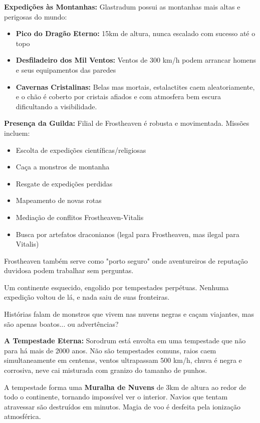 \textbf{\ringmfamily Expedições às Montanhas:}
Glastradum possui as montanhas mais altas e perigosas do mundo:
\begin{itemize}
    \item \textbf{Pico do Dragão Eterno:} 15km de altura, nunca escalado com sucesso até o topo
    \item \textbf{Desfiladeiro dos Mil Ventos:} Ventos de 300 km/h podem arrancar homens e seus equipamentos das paredes
    \item \textbf{Cavernas Cristalinas:} Belas mas mortais, estalactites caem aleatoriamente, e o chão é coberto por cristais afiados e com atmosfera bem escura dificultando a visibilidade.
\end{itemize}

\textbf{\ringmfamily Presença da Guilda:}
Filial de Frostheaven é robusta e movimentada. Missões incluem:
\begin{itemize}
    \item Escolta de expedições científicas/religiosas
    \item Caça a monstros de montanha
    \item Resgate de expedições perdidas
    \item Mapeamento de novas rotas
    \item Mediação de conflitos Frostheaven-Vitalis
    \item Busca por artefatos draconianos (legal para Frostheaven, mas ilegal para Vitalis)
\end{itemize}
Frostheaven também serve como "porto seguro" onde aventureiros de reputação duvidosa podem trabalhar sem perguntas.

Um continente esquecido, engolido por tempestades perpétuas. Nenhuma expedição voltou de lá, e nada saiu de suas fronteiras.

Histórias falam de monstros que vivem nas nuvens negras e caçam viajantes, mas são apenas boatos... ou advertências?

\textbf{\ringmfamily A Tempestade Eterna:}
Sorodrum está envolta em uma tempestade que não para há mais de 2000 anos. Não são tempestades comuns, raios caem simultaneamente em centenas, ventos ultrapassam 500 km/h, chuva é negra e corrosiva, neve cai misturada com granizo do tamanho de punhos.

A tempestade forma uma \textbf{Muralha de Nuvens} de 3km de altura ao redor de todo o continente, tornando impossível ver o interior. Navios que tentam atravessar são destruídos em minutos. Magia de voo é desfeita pela ionização atmosférica.


